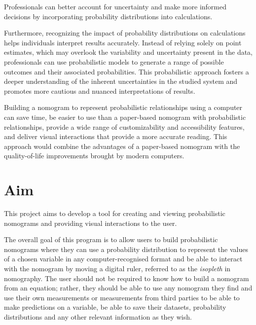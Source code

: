 \documentclass{l4proj}
\begin{document}
Professionals can better account for uncertainty and make more informed decisions by incorporating probability distributions into calculations. 

Furthermore, recognizing the impact of probability distributions on calculations helps individuals interpret results accurately. Instead of relying solely on point estimates, which may overlook the variability and uncertainty present in the data, professionals can use probabilistic models to generate a range of possible outcomes and their associated probabilities. This probabilistic approach fosters a deeper understanding of the inherent uncertainties in the studied system and promotes more cautious and nuanced interpretations of results.

Building a nomogram to represent probabilistic relationships using a computer can save time, be easier to use than a paper-based nomogram with probabilistic relationships, provide a wide range of customizability and accessibility features, and deliver visual interactions that provide a more accurate reading. This approach would combine the advantages of a paper-based nomogram with the quality-of-life improvements brought by modern computers. 
\section{Aim}
This project aims to develop a tool for creating and viewing probabilistic nomograms and providing visual interactions to the user. 

The overall goal of this program is to allow users to build probabilistic nomograms where they can use a probability distribution to represent the values of a chosen variable in any computer-recognised format and be able to interact with the nomogram by moving a digital ruler, referred to as the \textit{isopleth} in nomography. The user should not be required to know how to build a nomogram from an equation; rather, they should be able to use any nomogram they find and use their own measurements or measurements from third parties to be able to make predictions on a variable, be able to save their datasets, probability distributions and any other relevant information as they wish. 
\end{document}
